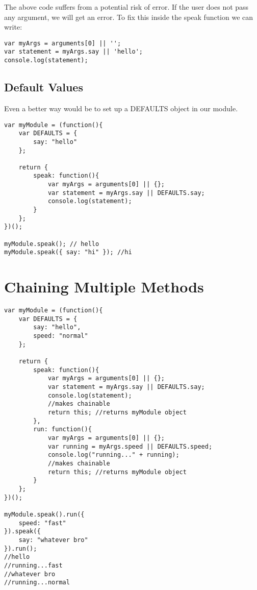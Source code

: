 \documentclass[12pt, a4paper]{article}
\begin{document}
The above code suffers from a potential risk of error.
If the user does not pass any argument, we will get an error.
To fix this inside the speak function we can write:
\begin{verbatim}
var myArgs = arguments[0] || '';
var statement = myArgs.say || 'hello';
console.log(statement);
\end{verbatim}
\subsection{Default Values}
Even a better way would be to set up a DEFAULTS object in our module.
\begin{verbatim}
var myModule = (function(){
    var DEFAULTS = {
        say: "hello"
    };

    return {
        speak: function(){
            var myArgs = arguments[0] || {};
            var statement = myArgs.say || DEFAULTS.say; 
            console.log(statement);
        }
    };
})();

myModule.speak(); // hello
myModule.speak({ say: "hi" }); //hi
\end{verbatim}

\section{Chaining Multiple Methods}
\begin{verbatim}
var myModule = (function(){
    var DEFAULTS = {
        say: "hello",
        speed: "normal"
    };

    return {
        speak: function(){
            var myArgs = arguments[0] || {};
            var statement = myArgs.say || DEFAULTS.say; 
            console.log(statement);
            //makes chainable
            return this; //returns myModule object
        },
        run: function(){
            var myArgs = arguments[0] || {};
            var running = myArgs.speed || DEFAULTS.speed;   
            console.log("running..." + running);
            //makes chainable
            return this; //returns myModule object
        }
    };
})();

myModule.speak().run({
    speed: "fast"
}).speak({
    say: "whatever bro"
}).run();
//hello
//running...fast
//whatever bro
//running...normal
\end{verbatim}
\end{document}
